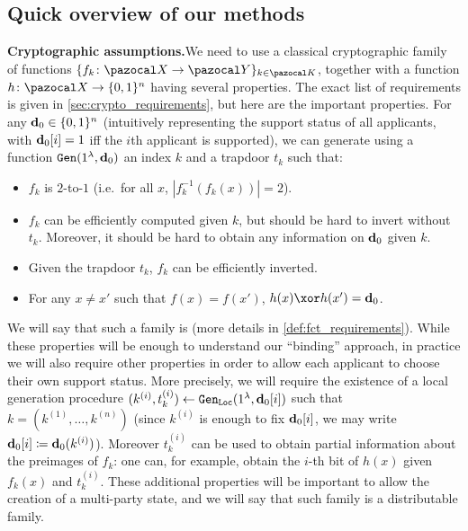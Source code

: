 
\subsection{Quick overview of our methods}\label{subsec:quick_overview}

\noindent\textbf{Cryptographic assumptions.}\quad We need to use a classical cryptographic family of functions $\{f_k\colon \cX \rightarrow \cY\}_{k \in \cK}$, together with a function $h\colon \cX \rightarrow \{0,1\}^n $ having several properties. The exact list of requirements is given in \cref{sec:crypto_requirements}, but here are the important properties. For any $\mathbf{d}_0 \in \{0,1\}^n$ (intuitively representing the support status of all applicants, with $\mathbf{d}_0[i] = 1$ iff the $i$th applicant is supported), we can generate using a function ${\tt Gen}(1^\lambda, \mathbf{d}_0)$ an index $k$ and a trapdoor $t_k$ such that:
\begin{itemize}
  \item $f_k$ is $2$-to-$1$ (i.e.\ for all $x$, $|f_k^{-1}(f_k(x))| = 2$).
  \item $f_k$ can be efficiently computed given $k$, but should be hard to invert without $t_k$. Moreover, it should be hard to obtain any information on $\mathbf{d}_0$ given $k$.
  \item Given the trapdoor $t_k$, $f_k$ can be efficiently inverted.
  \item For any $x \neq x'$ such that $f(x) = f(x')$, $h(x) \xor h(x') = \vect{d}_0$.
\end{itemize}
We will say that such a family is \AssumpFct{} (more details in \cref{def:fct_requirements}). While these properties will be enough to understand our ``binding'' approach, in practice we will also require other properties in order to allow each applicant to choose their own support status. More precisely, we will require the existence of a local generation procedure $(k^{(i)},t_k^{(i)}) \gets  {\tt Gen}_{\tt Loc}(1^\lambda,\mathbf{d}_0[i])$ such that $k = (k^{(1)},\dots,k^{(n)})$ (since $k^{(i)}$ is enough to fix $\mathbf{d}_0[i]$, we may write $\mathbf{d}_0[i] \coloneqq \mathbf{d}_0(k^{(i)})$). Moreover $t_k^{(i)}$ can be used to obtain partial information about the preimages of $f_k$: one can, for example, obtain the $i$-th bit of $h(x)$ given $f_k(x)$ and $t_k^{(i)}$. These additional properties will be important to allow the creation of a multi-party state, and we will say that such family is a distributable \AssumpFctCan{} family.\\

